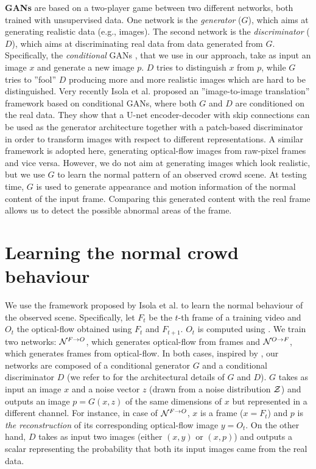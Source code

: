 \documentclass{article}
\begin{document}
	
	\noindent
	{\bf GANs} \cite{DBLP:conf/nips/GoodfellowPMXWOCB14,DBLP:conf/nips/SalimansGZCRCC16,DBLP:journals/corr/RadfordMC15} are based on a two-player game between two different networks, both trained with unsupervised data. One network is the {\em generator} ($G$), which aims at generating realistic data (e.g., images). The second network is the {\em discriminator} ($D$), which aims at discriminating real data from data generated from $G$. 
	Specifically, the {\em conditional} GANs \cite{DBLP:conf/nips/GoodfellowPMXWOCB14}, that we use in our approach,
	take as input an image $x$ and generate a new image $p$. 
	$D$ tries to distinguish $x$ from $p$, while $G$ tries to ''fool'' $D$ producing more and more realistic images which are hard to be distinguished.
	Very recently Isola et al. \cite{DBLP:journals/corr/IsolaZZE16} proposed an ''image-to-image translation'' framework based on conditional GANs, where both $G$ and $D$ are conditioned on the real data. They show that a U-net encoder-decoder with skip connections can be used as the generator architecture together with a patch-based discriminator in order to transform images with respect to different representations.
	A similar framework is adopted here, generating optical-flow images from raw-pixel frames and vice versa. However, we do not aim at generating images which look realistic, but we use $G$ to learn the normal pattern of an observed crowd scene. At testing time, $G$ is used to generate appearance and motion information of the normal content of the input frame.
	Comparing this generated content with the real frame allows us to detect the possible abnormal areas of the frame.
	
\section{Learning the normal crowd behaviour}
	\label{sec:learing}
	
	We use the framework proposed by Isola et al. \cite{DBLP:journals/corr/IsolaZZE16} to learn the normal behaviour of the observed scene. Specifically, let $F_t$ be the $t$-th frame of a training video and $O_t$ the optical-flow obtained using $F_t$ and $F_{t+1}$. $O_t$ is computed using \cite{brox2004high}.
	We train two networks: ${\cal N}^{F \rightarrow O}$, which generates optical-flow from frames and 
	${\cal N}^{O \rightarrow F}$, which generates frames from optical-flow.
	In both cases, inspired by \cite{DBLP:journals/corr/IsolaZZE16}, our networks are composed of a conditional generator $G$
	and a conditional discriminator $D$ (we refer to \cite{DBLP:journals/corr/IsolaZZE16} for the architectural details of $G$ and $D$). $G$ takes as input an image $x$ and a noise vector $z$ (drawn from a noise distribution ${\cal Z}$) and outputs an image $p = G(x,z)$ of the same dimensions 
	of $x$ 
	but represented in a different channel. For instance, in case of ${\cal N}^{F \rightarrow O}$, $x$ is a frame ($x = F_t$) and $p$ is {\em the reconstruction} of its corresponding optical-flow image $y = O_t$. On the other hand,
	$D$ takes as input two images (either $(x,y)$ or $(x,p)$) and outputs a scalar representing the probability that both its input images came from the real data.
	
\end{document}
